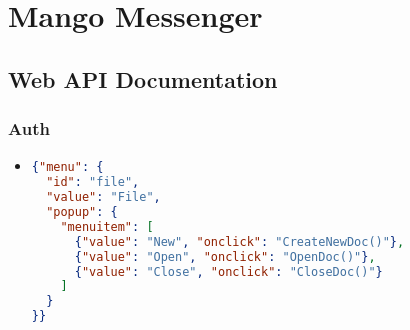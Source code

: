\chapter{Mango Messenger}\label{ch:mango-messenger}


\section{Web API Documentation}\label{sec:web-api-documentation}


    \subsection{Auth}\label{subsec:auth}
    \begin{itemize}
        \item \begin{lstlisting}[language=json,firstnumber=1,label={lst:lstlisting}]
{"menu": {
  "id": "file",
  "value": "File",
  "popup": {
    "menuitem": [
      {"value": "New", "onclick": "CreateNewDoc()"},
      {"value": "Open", "onclick": "OpenDoc()"},
      {"value": "Close", "onclick": "CloseDoc()"}
    ]
  }
}}
        \end{lstlisting}
    \end{itemize}

